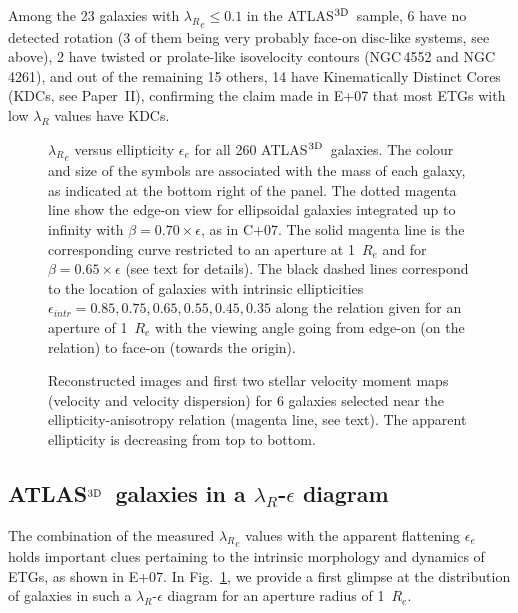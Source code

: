 \documentclass[useAMS,usenatbib,usegraphicx]{mn2e}
\newcommand{\atlas}{{ATLAS$^{\rm 3D}$}}
\begin{document}
Among the 23 galaxies with ${\lambda_R}_e \leq 0.1$ in the \atlas\ sample, 6 have no detected rotation
(3 of them being very probably face-on disc-like systems, see above), 2 have twisted or
prolate-like isovelocity contours (NGC\,4552 and NGC\,4261), and out of the remaining 15 others, 14 have
Kinematically Distinct Cores (KDCs, see Paper~II), confirming the 
claim made in E+07 that most ETGs with low $\lambda_R$ values have KDCs. 
\begin{figure}
\centering
{}
\caption{${\lambda_R}_e$ versus ellipticity $\epsilon_e$ for all 260 \atlas\ galaxies.
The colour and size of the symbols are associated with the mass of each galaxy,
as indicated at the bottom right of the panel. The dotted magenta line
show the edge-on view for ellipsoidal galaxies integrated up to infinity 
with $\beta = 0.70 \times \epsilon$, as in C+07. The solid magenta line
is the corresponding curve restricted to an aperture at 1~$R_e$ and for
$\beta = 0.65 \times \epsilon$ (see text for details). The black dashed lines correspond to the location
of galaxies with intrinsic ellipticities $\epsilon_{intr} = 0.85, 0.75, 0.65, 0.55, 0.45, 0.35$ 
along the relation given for an aperture of 1~$R_e$ with 
the viewing angle going from edge-on (on the relation) to face-on (towards the
origin).}
\label{fig:LREpsMass}
\end{figure}
\begin{figure}
\centering
{}
\caption{Reconstructed images and first two stellar velocity moment maps (velocity
and velocity dispersion) for 6 galaxies selected near the 
ellipticity-anisotropy relation (magenta line, see text).
The apparent ellipticity is decreasing from top to bottom.}
\label{fig:lineVmap}
\end{figure}
\subsection{\atlas\ galaxies in a $\lambda_R$-$\epsilon$ diagram}

The combination of the measured ${\lambda_R}_e$ values with the apparent
flattening $\epsilon_e$ holds important clues pertaining to the intrinsic
morphology and dynamics of ETGs, as shown in E+07. 
In Fig.~\ref{fig:LREpsMass}, we provide a first glimpse at the distribution of
galaxies in such a $\lambda_R$-$\epsilon$ diagram for an aperture radius of 1~$R_e$.
\end{document}

